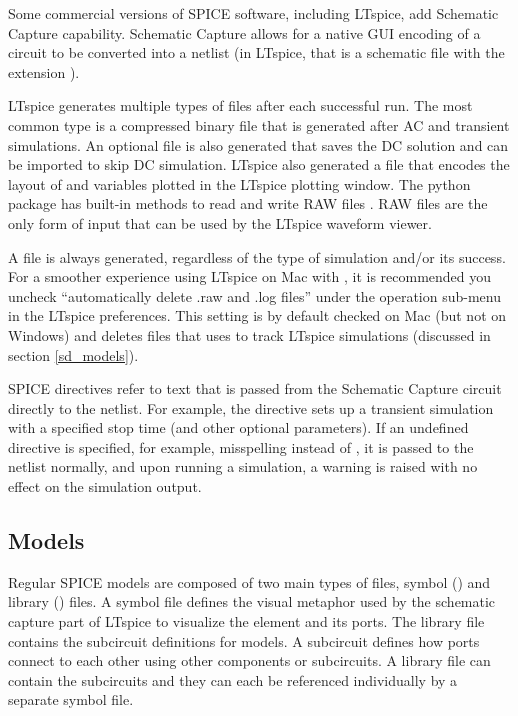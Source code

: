 Some commercial versions of SPICE
software, including LTspice, add Schematic Capture capability. Schematic Capture allows for a
native GUI encoding of a circuit to be converted into a netlist (in LTspice, that is a 
schematic file with the extension ).

LTspice generates multiple types of files after each successful run. The most common type is 
a compressed binary  file that is generated after AC and transient simulations. An
optional  file is also generated that saves the DC solution and can be imported
to skip DC simulation. LTspice also generated a  file that encodes the layout of and
variables plotted in the LTspice plotting window. The python package 
has built-in methods to read and write RAW files \cite{pyltspice}. RAW files
are the only form of input that can be used by the LTspice waveform viewer.

A  file is always generated, 
regardless of the type of simulation and/or its success. For a smoother experience using LTspice on Mac with , it is
recommended you uncheck ``automatically delete .raw and .log files'' under the operation sub-menu
in the LTspice preferences. This setting is by default checked on Mac (but not on Windows) and
deletes files that  uses to track LTspice simulations (discussed in section \ref{sd_models}).

SPICE directives refer to text that is passed from the Schematic Capture circuit directly to the netlist.
For example, the  directive sets up a transient simulation with a specified stop time (and other
optional parameters). If an undefined directive is specified, for example, misspelling  instead of , it is passed to the netlist normally, and upon running a simulation, a warning is raised
with no effect on the simulation output.

\subsection{Models}

Regular SPICE models are composed of two main types of files, symbol () and library
() files. A symbol file defines the visual metaphor used by the schematic capture
part of LTspice to visualize the element and its ports. The library file contains the subcircuit
definitions for models. A subcircuit defines how ports connect to each other using other components
or subcircuits. A library file can contain the subcircuits and they can each be referenced individually
by a separate symbol file.


